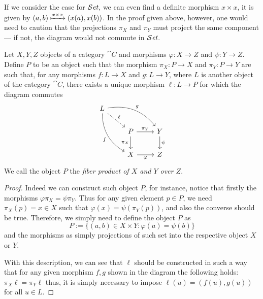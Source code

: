 If we consider the case for \({\mathcal{S}\textit{et}}\), we can even find a definite morphism \(x
\times x\), it is given by \((a, b) \xmapsto{x \times x} (x(a), x(b))\). In the
proof given above, however, one would need to caution that the projections
\(\pi_X\) and \(\pi_Y\) must project the same component --- if not, the diagram
would not commute in \({\mathcal{S}\textit{et}}\).

\begin{proposition}
   Let \(X, Y, Z\) objects of a category \(\cat C\) and morphisms \(\varphi :X
   \to Z\) and \(\psi : Y \to Z\). Define \(P\) to be an object such that the
   morphism  \(\pi_X : P \to X\) and  \(\pi_Y : P \to Y\) are such that, for any
   morphisms \(f : L \to X\) and  \(g : L \to Y\), where \(L\) is another object
   of the category \(\cat C\), there exists a unique morphism \(\ell: L \to P\)
   for which the diagram commutes
   \[
     \begin{tikzcd}
       L
       \ar[dr, dashed, "\ell"]
       \ar[drr, bend left, "g"]
       \ar[ddr, bend right, swap, "f"]
        &
          & \\
        &P
        \ar[r, "\pi_Y"]
        \ar[d, swap, "\pi_X"]
          &Y
          \ar[d, "\psi"]
          \\
        &X
        \ar[r, swap, "\varphi"]
          &Z
     \end{tikzcd}
   \]
   We call the object \(P\) the \emph{fiber product of \(X\) and \(Y\) over
   \(Z\)}.
\end{proposition}

\begin{proof}
   Indeed we can construct such object \(P\), for instance, notice that firstly
   the morphisms \(\varphi  \pi_X = \psi  \pi_Y\). Thus for any
   given element \(p \in P\), we need \(\pi_X(p) = x \in X\) such that
   \(\varphi(x) = \psi(\pi_Y(p))\), and also the converse should be true.
   Therefore, we simply need to define the object \(P\) as
   \[
      P := \{(a, b) \in X \times Y : \varphi(a) = \psi(b)\}
   \]
   and the morphisms as simply projections of such set into the respective
   object \(X\) or \(Y\).

   With this description, we can see that \(\ell\) should be constructed in such
   a way that for any given morphism \(f, g\) shown in the diagram the following
   holds: \(\pi_X  \ell = \pi_Y  \ell\) thus, it is simply necessary
   to impose \(\ell(u) = (f(u), g(u))\) for all \(u \in L\).
\end{proof}


